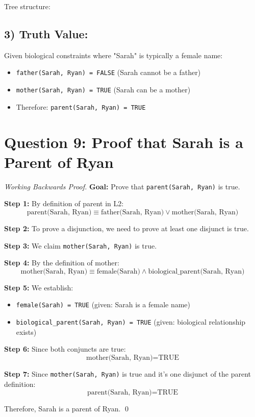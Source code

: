\documentclass[12pt]{article}
\theoremstyle{definition}
\begin{document}
Tree structure:
\begin{center}
\end{center}

\subsection*{3) Truth Value:}
Given biological constraints where "Sarah" is typically a female name:
\begin{itemize}
    \item \texttt{father(Sarah, Ryan) = FALSE} (Sarah cannot be a father)
    \item \texttt{mother(Sarah, Ryan) = TRUE} (Sarah can be a mother)
    \item Therefore: \texttt{parent(Sarah, Ryan) = TRUE}
\end{itemize}

\section*{Question 9: Proof that Sarah is a Parent of Ryan}

\begin{proof}[Working Backwards Proof]
\textbf{Goal:} Prove that \texttt{parent(Sarah, Ryan)} is true.

\textbf{Step 1:} By definition of parent in L2:
\[\text{parent(Sarah, Ryan)} \equiv \text{father(Sarah, Ryan)} \vee \text{mother(Sarah, Ryan)}\]

\textbf{Step 2:} To prove a disjunction, we need to prove at least one disjunct is true.

\textbf{Step 3:} We claim \texttt{mother(Sarah, Ryan)} is true.

\textbf{Step 4:} By the definition of mother:
\[\text{mother(Sarah, Ryan)} \equiv \text{female(Sarah)} \wedge \text{biological\_parent(Sarah, Ryan)}\]

\textbf{Step 5:} We establish:
\begin{itemize}
    \item \texttt{female(Sarah) = TRUE} (given: Sarah is a female name)
    \item \texttt{biological\_parent(Sarah, Ryan) = TRUE} (given: biological relationship exists)
\end{itemize}

\textbf{Step 6:} Since both conjuncts are true:
\[\text{mother(Sarah, Ryan)} = \text{TRUE}\]

\textbf{Step 7:} Since \texttt{mother(Sarah, Ryan)} is true and it's one disjunct of the parent definition:
\[\text{parent(Sarah, Ryan)} = \text{TRUE}\]

Therefore, Sarah is a parent of Ryan. \qed
\end{proof}
\end{document}
